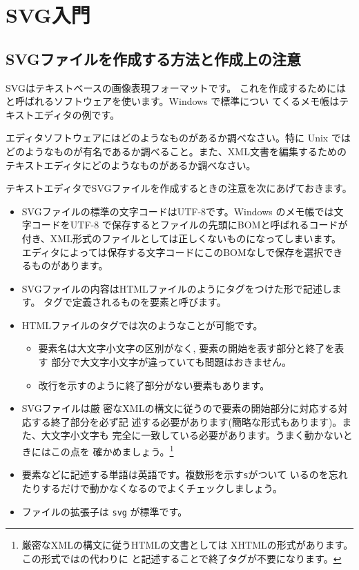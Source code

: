 \chapter{SVG入門}
\section{SVGファイルを作成する方法と作成上の注意}
SVGはテキストベースの画像表現フォーマットです。
これを作成するためには
と呼ばれるソフトウェアを使います。Windows で標準につい
てくるメモ帳はテキストエディタの例です。
\begin{Problem}
エディタソフトウェアにはどのようなものがあるか調べなさい。特に Unix では
 どのようなものが有名であるか調べること。また、XML文書を編集するための
 テキストエディタにどのようなものがあるか調べなさい。
\end{Problem}
テキストエディタでSVGファイルを作成するときの注意を次にあげておきます。
\begin{itemize}
 \item SVGファイルの標準の文字コードはUTF-8です。Windows のメモ帳では文
			 字コードをUTF-8 で保存するとファイルの先頭にBOMと呼ばれるコードが
			 付き、XML形式のファイルとしては正しくないものになってしまいます。
			 エディタによっては保存する文字コードにこのBOMなしで保存を選択でき
			 るものがあります。
 \item SVGファイルの内容はHTMLファイルのようにタグをつけた形で記述します。
       タグで定義されるものを要素と呼びます。
 \item HTMLファイルのタグでは次のようなことが可能です。
\begin{itemize}
 \item 要素名は大文字小文字の区別がなく, 要素の開始を表す部分と終了を表す
       部分で大文字小文字が違っていても問題はおきません。
 \item 改行を示すのように終了部分がない要素もあります。
\end{itemize}
 \item SVGファイルは厳
       密なXMLの構文に従うので要素の開始部分に対応する対応する終了部分を必ず記
       述する必要があります(簡略な形式もあります)。また、大文字小文字も
       完全に一致している必要があります。うまく動かないときにはこの点を
       確かめましょう。\footnote{厳密なXMLの構文に従うHTMLの文書としては
       XHTMLの形式があります。この形式ではの代わりに
        と記述することで終了タグが不要になります。}
 \item 要素などに記述する単語は英語です。複数形を示す\texttt{s}がついて
       いるのを忘れたりするだけで動かなくなるのでよくチェックしましょう。
 \item ファイルの拡張子は \texttt{svg} が標準です。
\end{itemize}

